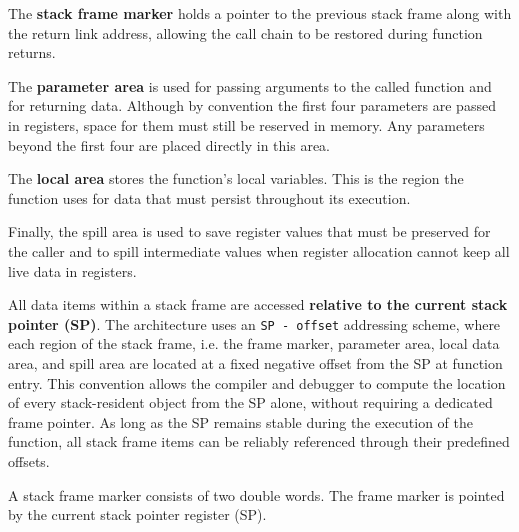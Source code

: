 The \textbf{stack frame marker} holds a pointer to the previous stack frame along with the return link address, allowing the call chain to be restored during function returns. 

The \textbf{parameter area} is used for passing arguments to the called function and for returning data. Although by convention the first four parameters are passed in registers, space for them must still be reserved in memory. Any parameters beyond the first four are placed directly in this area.

The \textbf{local area} stores the function’s local variables. This is the region the function uses for data that must persist throughout its execution.

Finally, the spill area is used to save register values that must be preserved for the caller and to spill intermediate values when register allocation cannot keep all live data in registers.


All data items within a stack frame are accessed \textbf{relative to the current stack pointer (SP)}. The architecture uses an \texttt{SP - offset} addressing scheme, where each region of the stack frame, i.e. the frame marker, parameter area, local data area, and spill area are located at a fixed negative offset from the SP at function entry. This convention allows the compiler and debugger to compute the location of every stack-resident object from the SP alone, without requiring a dedicated frame pointer. As long as the SP remains stable during the execution of the function, all stack frame items can be reliably referenced through their predefined offsets.
 

A stack frame marker consists of two double words. The frame marker is pointed by the current stack pointer register (SP).

